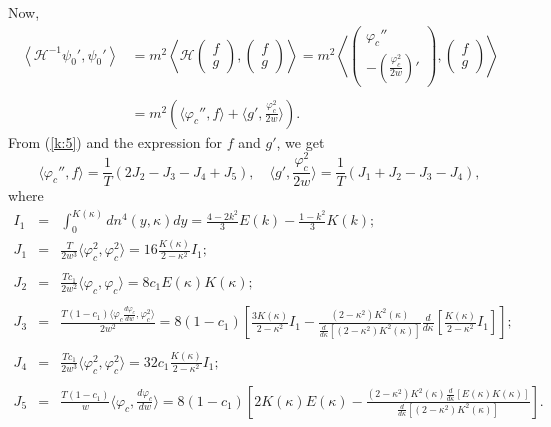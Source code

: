 \documentclass[final,11pt,leqno]{amsart}
\begin{document}
Now,
    $$\begin{array}{ll}
    \left\langle {\mathcal H}^{-1}\psi_0', \psi_0'\right\rangle&=m^2\left\langle {\mathcal H} \left(\begin{array}{cc} f\\g\end{array}\right),
     \left(\begin{array}{cc} f\\g\end{array}\right)\right\rangle=m^2\left\langle \left(\begin{array}{cc} {\varphi}_c''\\-({\frac{{\varphi}_c^2}{2w}})'\end{array}\right),
    \left(\begin{array}{cc} f\\g\end{array}\right)\right\rangle \\
    \\
    &=m^2\left(\langle{\varphi}_c'',f\rangle+\langle g', {\frac{{\varphi}_c^2}{2w}}\rangle \right).\end{array}$$
    From (\ref{k:5}) and the expression for $f$ and $g'$, we get
      $$ \langle {\varphi}_c'', f\rangle ={\frac{1}{T}}(2J_2-J_3-J_4+J_5), \quad \langle g', {\frac{{\varphi}_c^2}{2w}}\rangle={\frac{1}{T}}(J_1+J_2-J_3-J_4), $$
      where
\begin{eqnarray*}
I_1 &=& \int_{0}^{K(\kappa)}{dn^4(y, \kappa)}dy=\frac{4-2k^2}{3}E(k)-\frac{1-k^2}{3}K(k); \\
          J_1 &=& {\frac{T}{2w^3}}\langle {\varphi}_c^2, {\varphi}_c^2\rangle=16{\frac{K(\kappa)}{2-\kappa^2}}I_1;
          \\
          \\
          J_2 &=& {\frac{Tc_1}{2w^2}}\langle {\varphi}_c, {\varphi}_c\rangle=8c_1E(\kappa)K(\kappa);
          \\
          \\
          J_3 &=& {\frac{T(1-c_1)\langle {\varphi}_c{\frac{d{\varphi}_c}{dw}}, {\varphi}_c^2\rangle}{2w^2}} =8(1-c_1)\left[ {\frac{3K(\kappa)}{2-\kappa^2}}I_1
          -{\frac{(2-\kappa^2)K^2(\kappa)}{{\frac{d}{d\kappa}}[(2-\kappa^2)K^2(\kappa)]}}{\frac{d}{d\kappa}}\left[ {\frac{K(\kappa)}{2-\kappa^2}}I_1\right]\right];\\
          \\
          J_4 &=& {\frac{Tc_1}{2w^3}}\langle {\varphi}_c^2, {\varphi}_c^2\rangle=32c_1{\frac{K(\kappa)}{2-\kappa^2}}I_1;\\
          \\
          J_5 &=&
          {\frac{T(1-c_1)}{w}}\langle {\varphi}_c, {\frac{d{\varphi}_c}{dw}}\rangle=8(1-c_1)
          \left[
          2K(\kappa)E(\kappa)-{\frac{(2-\kappa^2)K^2(\kappa){\frac{d}{d\kappa}}[E(\kappa)K(\kappa)]}{{\frac{d}{d\kappa}}[(2-\kappa^2)K^2(\kappa)]}}\right].
          \end{eqnarray*}
\end{document}
